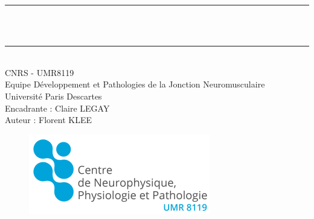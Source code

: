 \begin{center}
\rule{\textwidth}{0.5pt} \\[0.4cm]
{\huge \bfseries \titredoc\\[0.4cm]} %
\rule{\textwidth}{0.5pt} \\[1.5cm]

CNRS - UMR8119\\
Equipe Développement et Pathologies de la Jonction Neuromusculaire\\
Université Paris Descartes\\
Encadrante : Claire LEGAY\\
\vspace{1cm}
Auteur : Florent KLEE\\


\begin{figure}[!b] %
	\centering
	\includegraphics[height=0.1\textheight]{./Images/Logo_UMR8119.png}
\end{figure}

\end{center}